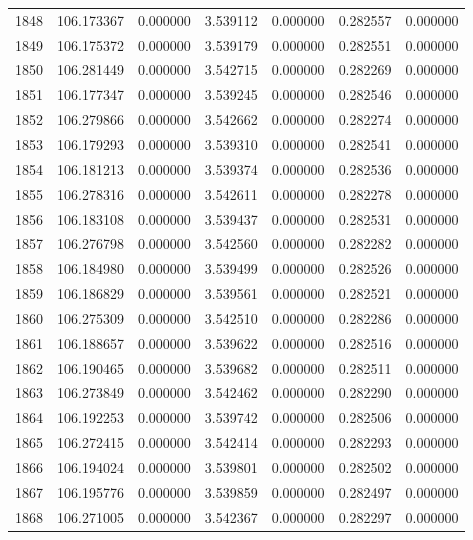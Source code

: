 \begin{tabular}{rrrrrrr}
1848 & 106.173367 &    0.000000 &  3.539112 &   0.000000 &   0.282557 &  0.000000 \\
1849 & 106.175372 &    0.000000 &  3.539179 &   0.000000 &   0.282551 &  0.000000 \\
1850 & 106.281449 &    0.000000 &  3.542715 &   0.000000 &   0.282269 &  0.000000 \\
1851 & 106.177347 &    0.000000 &  3.539245 &   0.000000 &   0.282546 &  0.000000 \\
1852 & 106.279866 &    0.000000 &  3.542662 &   0.000000 &   0.282274 &  0.000000 \\
1853 & 106.179293 &    0.000000 &  3.539310 &   0.000000 &   0.282541 &  0.000000 \\
1854 & 106.181213 &    0.000000 &  3.539374 &   0.000000 &   0.282536 &  0.000000 \\
1855 & 106.278316 &    0.000000 &  3.542611 &   0.000000 &   0.282278 &  0.000000 \\
1856 & 106.183108 &    0.000000 &  3.539437 &   0.000000 &   0.282531 &  0.000000 \\
1857 & 106.276798 &    0.000000 &  3.542560 &   0.000000 &   0.282282 &  0.000000 \\
1858 & 106.184980 &    0.000000 &  3.539499 &   0.000000 &   0.282526 &  0.000000 \\
1859 & 106.186829 &    0.000000 &  3.539561 &   0.000000 &   0.282521 &  0.000000 \\
1860 & 106.275309 &    0.000000 &  3.542510 &   0.000000 &   0.282286 &  0.000000 \\
1861 & 106.188657 &    0.000000 &  3.539622 &   0.000000 &   0.282516 &  0.000000 \\
1862 & 106.190465 &    0.000000 &  3.539682 &   0.000000 &   0.282511 &  0.000000 \\
1863 & 106.273849 &    0.000000 &  3.542462 &   0.000000 &   0.282290 &  0.000000 \\
1864 & 106.192253 &    0.000000 &  3.539742 &   0.000000 &   0.282506 &  0.000000 \\
1865 & 106.272415 &    0.000000 &  3.542414 &   0.000000 &   0.282293 &  0.000000 \\
1866 & 106.194024 &    0.000000 &  3.539801 &   0.000000 &   0.282502 &  0.000000 \\
1867 & 106.195776 &    0.000000 &  3.539859 &   0.000000 &   0.282497 &  0.000000 \\
1868 & 106.271005 &    0.000000 &  3.542367 &   0.000000 &   0.282297 &  0.000000 \\

\end{tabular}
